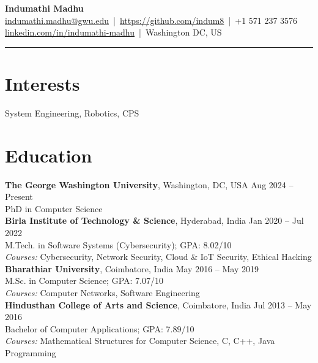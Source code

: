 \documentclass[a4paper,11pt]{article}
\begin{document}
\begin{center}
    {\LARGE \textbf{Indumathi Madhu}} \\
    \vspace{4pt}
    \href{mailto:indumathi.madhu@gwu.edu}{indumathi.madhu@gwu.edu} \,|\,
    \href{https://github.com/indum8}{https://github.com/indum8} \,|\,
    +1 571 237 3576 \\
    \href{https://www.linkedin.com/in/indumathi-madhu/}{linkedin.com/in/indumathi-madhu} \,|\,
    Washington DC, US
\end{center}
\noindent\rule{\textwidth}{0.4pt} %

\section*{Interests}
System Engineering, Robotics, CPS


\section*{Education}

\noindent
\textbf{The George Washington University}, Washington, DC, USA \hfill Aug 2024 -- Present \\
PhD in Computer Science \\[6pt]
\noindent
\textbf{Birla Institute of Technology \& Science}, Hyderabad, India \hfill Jan 2020 -- Jul 2022 \\
M.Tech. in Software Systems (Cybersecurity); GPA: 8.02/10 \\
\textit{Courses:} Cybersecurity, Network Security, Cloud \& IoT Security, Ethical Hacking \\[6pt]
\noindent
\textbf{Bharathiar University}, Coimbatore, India \hfill May 2016 -- May 2019 \\
M.Sc. in Computer Science; GPA: 7.07/10 \\
\textit{Courses:} Computer Networks, Software Engineering \\[6pt]
\noindent
\textbf{Hindusthan College of Arts and Science}, Coimbatore, India \hfill Jul 2013 -- May 2016 \\
Bachelor of Computer Applications; GPA: 7.89/10 \\
\textit{Courses:} Mathematical Structures for Computer Science, C, C++, Java Programming
\end{document}
